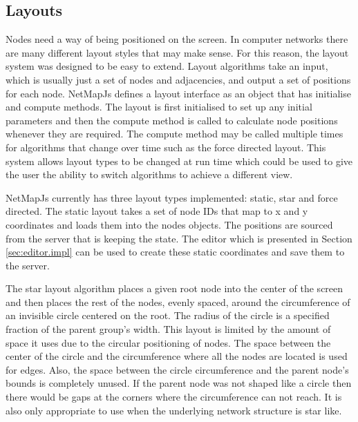 \documentclass[11pt, a4paper]{article}
\begin{document}
\subsection{Layouts}
\label{sec:layouts.impl}

Nodes need a way of being positioned on the screen. In computer networks there
are many different layout styles that may make sense. For this reason, the
layout system was designed to be easy to extend. Layout algorithms take an
input, which is usually just a set of nodes and adjacencies, and output a set of
positions for each node. NetMapJs defines a layout interface as an object that
has initialise and compute methods. The layout is first initialised to set up
any initial parameters and then the compute method is called to calculate node
positions whenever they are required. The compute method may be called multiple
times for algorithms that change over time such as the force directed layout.
This system allows layout types to be changed at run time which could be used to
give the user the ability to switch algorithms to achieve a different view.

NetMapJs currently has three layout types implemented: static, star and force
directed. The static layout takes a set of node IDs that map to x and y
coordinates and loads them into the nodes objects. The positions are sourced
from the server that is keeping the state. The editor which is presented in
Section \ref{sec:editor.impl} can be used to create these static coordinates and
save them to the server.

The star layout algorithm places a given root node into the center of the screen
and then places the rest of the nodes, evenly spaced, around the circumference
of an invisible circle centered on the root. The radius of the circle is a
specified fraction of the parent group's width. This layout is limited by the
amount of space it uses due to the circular positioning of nodes. The space
between the center of the circle and the circumference where all the nodes are
located is used for edges. Also, the space between the circle circumference and
the parent node's bounds is completely unused. If the parent node was not shaped
like a circle then there would be gaps at the corners where the circumference
can not reach. It is also only appropriate to use when the underlying network
structure is star like.
\end{document}
